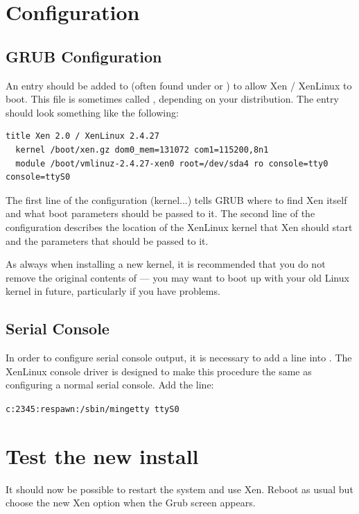 \documentclass[11pt,twoside,final,openright]{xenstyle}
\begin{document}
\section{Configuration}

\subsection{GRUB Configuration}

An entry should be added to  (often found under
 or ) to allow Xen / XenLinux to boot.
This file is sometimes called , depending on your
distribution.  The entry should look something like the following:

\begin{verbatim}
title Xen 2.0 / XenLinux 2.4.27
  kernel /boot/xen.gz dom0_mem=131072 com1=115200,8n1
  module /boot/vmlinuz-2.4.27-xen0 root=/dev/sda4 ro console=tty0 console=ttyS0
\end{verbatim}

The first line of the configuration (kernel...) tells GRUB where to
find Xen itself and what boot parameters should be passed to it.  The
second line of the configuration describes the location of the
XenLinux kernel that Xen should start and the parameters that should
be passed to it.

As always when installing a new kernel, it is recommended that you do
not remove the original contents of  --- you may want
to boot up with your old Linux kernel in future, particularly if you
have problems.

\subsection{Serial Console}

In order to configure serial console output, it is necessary to add a
line into .  The XenLinux console driver is
designed to make this procedure the same as configuring a normal
serial console.  Add the line:

{\tt c:2345:respawn:/sbin/mingetty ttyS0}

\section{Test the new install}

It should now be possible to restart the system and use Xen.  Reboot
as usual but choose the new Xen option when the Grub screen appears.
\end{document}
